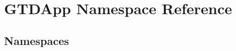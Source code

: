 \hypertarget{namespace_g_t_d_app}{}\section{G\+T\+D\+App Namespace Reference}
\label{namespace_g_t_d_app}
\subsection*{Namespaces}
\begin{DoxyCompactItemize}
\end{DoxyCompactItemize}
